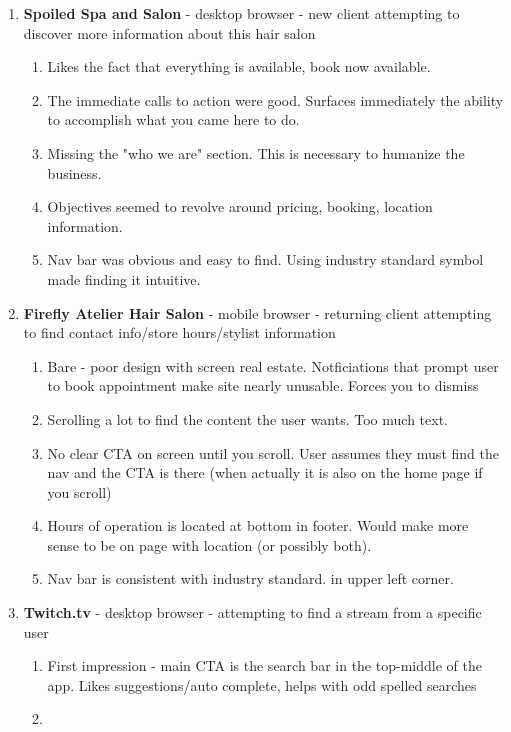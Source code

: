\begin{enumerate}
\item
  \textbf{Spoiled Spa and Salon} - desktop browser - new client attempting to discover more information about this hair salon
  \begin{enumerate}
  \item
    Likes the fact that everything is available, book now available.
  \item
    The immediate calls to action were good. Surfaces immediately the ability to accomplish what you came here to do.
  \item
    Missing the "who we are" section. This is necessary to humanize the business.
  \item
    Objectives seemed to revolve around pricing, booking, location information.
  \item
    Nav bar was obvious and easy to find. Using industry standard symbol made finding it intuitive.
  \end{enumerate}
\item
  \textbf{Firefly Atelier Hair Salon} - mobile browser - returning client attempting to find contact info/store hours/stylist information
  \begin{enumerate}
  \item
    Bare - poor design with screen real estate. Notficiations that prompt user to book appointment make site nearly unusable. Forces you to dismiss
  \item
    Scrolling a lot to find the content the user wants. Too much text.
  \item
    No clear CTA on screen until you scroll. User assumes they must find the nav and the CTA is there (when actually it is also on the home page if you scroll)
  \item
    Hours of operation is located at bottom in footer. Would make more sense to be on page with location (or possibly both).
  \item
    Nav bar is consistent with industry standard.  in upper left corner.
  \end{enumerate}
\item
  \textbf{Twitch.tv} - desktop browser - attempting to find a stream from a specific user
  \begin{enumerate}
  \item
    First impression - main CTA is the search bar in the top-middle of the app. Likes suggestions/auto complete, helps with odd spelled searches
  \item

\end{enumerate}
\end{enumerate}
